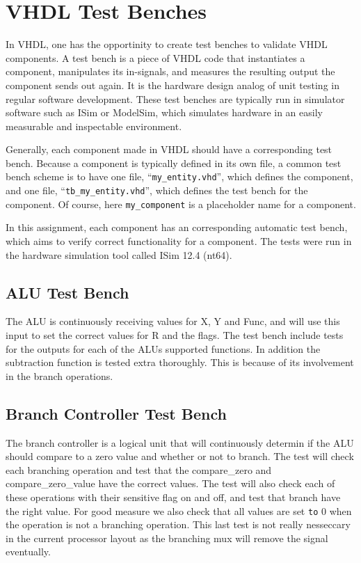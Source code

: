\section{VHDL Test Benches}

In VHDL, one has the opportinity to create test benches to validate VHDL components.
A test bench is a piece of VHDL code that instantiates a component, manipulates its in-signals, and measures the resulting output the component sends out again.
It is the hardware design analog of unit testing in regular software development.
These test benches are typically run in simulator software such as ISim or ModelSim, which simulates hardware in an easily measurable and inspectable environment.

Generally, each component made in VHDL should have a corresponding test bench.
Because a component is typically defined in its own file, a common test bench scheme is to have one file, ``\texttt{my\_entity.vhd}'', which defines the component, and one file, ``\texttt{tb\_my\_entity.vhd}'', which defines the test bench for the component.
Of course, here \texttt{my\_component} is a placeholder name for a component.

In this assignment, each component has an corresponding automatic test bench, which aims to verify correct functionality for a component.
The tests were run in the hardware simulation tool called ISim 12.4 (nt64).

\subsection{ALU Test Bench}

The ALU is continuously receiving values for X, Y and Func, and will use this input to set the correct values for R and the flags.
The test bench include tests for the outputs for each of the ALUs supported functions.
In addition the subtraction function is tested extra thoroughly.
This is because of its involvement in the branch operations.

\subsection{Branch Controller Test Bench}

The branch controller is a logical unit that will continuously determin if the ALU should compare to a zero value and whether or not to branch.
The test will check each branching operation and test that the compare\_zero and compare\_zero\_value have the correct values.
The test will also check each of these operations with their sensitive flag on and off, and test that branch have the right value.
For good measure we also check that all values are set \texttt{to} 0 when the operation is not a branching operation.
This last test is not really nesseccary in the current processor layout as the branching mux will remove the signal eventually.

